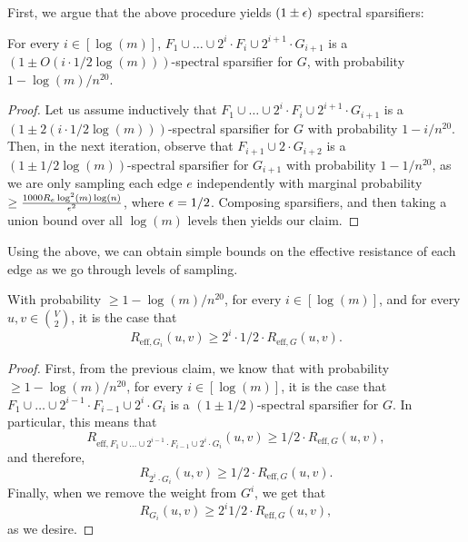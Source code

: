 \documentclass{article}
\begin{document}
First, we argue that the above procedure yields $(1 \pm \epsilon)$ spectral sparsifiers:

\begin{claim}
    For every $i \in  [\log(m)]$, $F_1 \cup \dots \cup 2^i \cdot F_i \cup 2^{i+1} \cdot G_{i+1}$ is a $(1 \pm O(i \cdot 1 / 2\log(m)))$-spectral sparsifier for $G$, with probability $1 - \log(m) / n^{20}$.
\end{claim}

\begin{proof}
    Let us assume inductively that $F_1 \cup \dots \cup 2^i \cdot F_i \cup 2^{i+1} \cdot G_{i+1}$ is a $(1 \pm 2(i \cdot 1 / 2\log(m)))$-spectral sparsifier for $G$ with probability $1 - i / n^{20}$. Then, in the next iteration, observe that $F_{i+1} \cup 2 \cdot G_{i+2}$ is a $(1 \pm 1 / 2\log(m))$-spectral sparsifier for $G_{i+1}$ with probability $1 - 1 / n^{20}$, as we are only sampling each edge $e$ independently with marginal probability $\geq \frac{1000 R_e \log^2(m) \log(n)}{\epsilon^2}$, where $\epsilon = 1/2$. Composing sparsifiers, and then taking a union bound over all $\log(m)$ levels then yields our claim. 
\end{proof}

Using the above, we can obtain simple bounds on the effective resistance of each edge as we go through levels of sampling. 

\begin{claim}
    With probability $\geq 1 - \log(m) / n^{20}$, for every $i \in [\log(m)]$, and for every $u, v \in \binom{V}{2}$, it is the case that 
    \[
    R_{\mathrm{eff}, G_i}(u,v) \geq 2^i\cdot 1/2 \cdot R_{\mathrm{eff}, G}(u,v).
    \]
\end{claim}

\begin{proof}
    First, from the previous claim, we know that with probability $\geq 1 - \log(m) / n^{20}$, for every $i \in [\log(m)]$, it is the case that $F_1 \cup \dots \cup 2^{i-1} \cdot F_{i-1} \cup 2^{i} \cdot G_{i}$ is a $(1 \pm 1/2)$-spectral sparsifier for $G$. In particular, this means that 
    \[
    R_{\mathrm{eff}, F_1 \cup \dots \cup 2^{i-1} \cdot F_{i-1} \cup 2^{i} \cdot G_{i}}(u,v) \geq 1/2 \cdot R_{\mathrm{eff}, G}(u,v),
    \]
    and therefore, 
    \[
     R_{2^{i} \cdot G_{i}}(u,v) \geq 1/2 \cdot R_{\mathrm{eff}, G}(u,v).
    \]
    Finally, when we remove the weight from $G^{i}$, we get that 
    \[
    R_{G_{i}}(u,v) \geq 2^i 1/2 \cdot R_{\mathrm{eff}, G}(u,v),
    \]
    as we desire. 
\end{proof}
\end{document}
